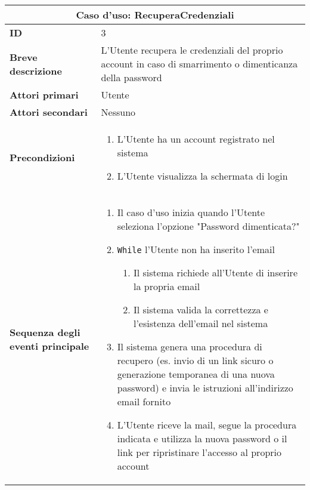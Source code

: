 \documentclass[a4paper]{report}
\begin{document}
\clearpage
\begin{table}[H]
\vspace*{-0cm}
\renewcommand{\arraystretch}{1.9}
\begin{tabular}{|p{3.9cm}|p{9.9cm}|}
\hline
\multicolumn{2}{|c|}{\textbf{Caso d’uso: RecuperaCredenziali}} \\ \hline
\textbf{ID} & 3 \\ \hline
\textbf{Breve descrizione} & L’Utente recupera le credenziali del proprio account in caso di smarrimento o dimenticanza della password \\ \hline
\textbf{Attori primari} & Utente \\ \hline
\textbf{Attori secondari} & Nessuno \\ \hline
\textbf{Precondizioni} & \begin{enumerate}[leftmargin=14pt,label=\arabic*.,labelsep=0.5em,topsep=0pt,partopsep=0pt,parsep=0pt,itemsep=0pt]
    \item L'Utente ha un account registrato nel sistema
    \item L'Utente visualizza la schermata di login
\end{enumerate} \\ \hline
\textbf{Sequenza degli eventi principale} &
\begin{enumerate}[leftmargin=14pt,label=\arabic*.,labelsep=0.5em,topsep=0pt,partopsep=0pt,parsep=0pt,itemsep=0pt]
    \item Il caso d'uso inizia quando l'Utente seleziona l’opzione "Password dimenticata?"
    \item \texttt{While} l'Utente non ha inserito l'email
    \begin{enumerate}[label=\arabic{enumi}.\arabic*.,leftmargin=22pt,labelsep=0.5em,topsep=0pt,partopsep=0pt,parsep=0pt,itemsep=0pt]
        \item Il sistema richiede all’Utente di inserire la propria email
        \item Il sistema valida la correttezza e l’esistenza dell’email nel sistema
    \end{enumerate}
    \item Il sistema genera una procedura di recupero (es. invio di un link sicuro o generazione temporanea di una nuova password) e invia le istruzioni all’indirizzo email fornito
    \item L'Utente riceve la mail, segue la procedura indicata e utilizza la nuova password o il link per ripristinare l’accesso al proprio account
\end{enumerate}\\ \hline

\end{tabular}
\end{table}
\end{document}
